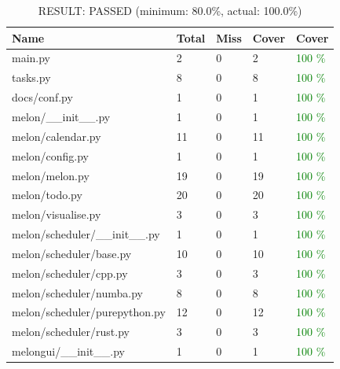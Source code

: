 \documentclass{prettytex/ox/mmsc-special-topic}
\begin{document}
  \begin{table}[H]
    \centering
    \caption{RESULT: PASSED (minimum: 80.0\%, actual: 100.0\%)}
    \begin{tabular}{lllll}
      \hline
      \bf Name                        & \bf Total & \bf Miss & \bf Cover & \bf Cover                 \\
      \hline
      main.py                         & 2         & 0        & 2         & \textcolor{green}{100 \%} \\
      tasks.py                        & 8         & 0        & 8         & \textcolor{green}{100 \%} \\
      docs/conf.py                    & 1         & 0        & 1         & \textcolor{green}{100 \%} \\
      melon/\_\_init\_\_.py           & 1         & 0        & 1         & \textcolor{green}{100 \%} \\
      melon/calendar.py               & 11        & 0        & 11        & \textcolor{green}{100 \%} \\
      melon/config.py                 & 1         & 0        & 1         & \textcolor{green}{100 \%} \\
      melon/melon.py                  & 19        & 0        & 19        & \textcolor{green}{100 \%} \\
      melon/todo.py                   & 20        & 0        & 20        & \textcolor{green}{100 \%} \\
      melon/visualise.py              & 3         & 0        & 3         & \textcolor{green}{100 \%} \\
      melon/scheduler/\_\_init\_\_.py & 1         & 0        & 1         & \textcolor{green}{100 \%} \\
      melon/scheduler/base.py         & 10        & 0        & 10        & \textcolor{green}{100 \%} \\
      melon/scheduler/cpp.py          & 3         & 0        & 3         & \textcolor{green}{100 \%} \\
      melon/scheduler/numba.py        & 8         & 0        & 8         & \textcolor{green}{100 \%} \\
      melon/scheduler/purepython.py   & 12        & 0        & 12        & \textcolor{green}{100 \%} \\
      melon/scheduler/rust.py         & 3         & 0        & 3         & \textcolor{green}{100 \%} \\
      melongui/\_\_init\_\_.py        & 1         & 0        & 1         & \textcolor{green}{100 \%} \\

\end{tabular}
\end{table}
\end{document}
